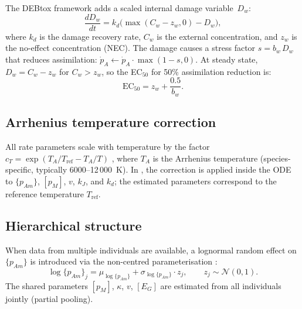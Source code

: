 \documentclass[article,shortnames]{jss}
\newcommand{\pAm}{\{p_{Am}\}}
\newcommand{\pM}{[p_M]}
\newcommand{\EG}{[E_G]}
\begin{document}
The DEBtox framework \citep{JagerDEBtox2006, JagerZimmer2012} adds a
scaled internal damage variable~$D_w$:
\begin{equation}
  \frac{dD_w}{dt} = k_d \bigl(\max(C_w - z_w, 0) - D_w\bigr),
    \label{eq:Dw}
\end{equation}
where $k_d$ is the damage recovery rate, $C_w$ is the external
concentration, and $z_w$ is the no-effect concentration (NEC).  The
damage causes a stress factor $s = b_w \, D_w$ that reduces
assimilation: $\dot{p}_A \leftarrow \dot{p}_A \cdot \max(1 - s, 0)$.
At steady state, $D_w = C_w - z_w$ for $C_w > z_w$, so the
EC$_{50}$ for 50\% assimilation reduction is:
\begin{equation}
  \mathrm{EC}_{50} = z_w + \frac{0.5}{b_w}.
    \label{eq:EC50}
\end{equation}

\subsection{Arrhenius temperature correction} \label{sec:arrhenius}

All rate parameters scale with temperature by the factor
$c_T = \exp(T_A / T_{\mathrm{ref}} - T_A / T)$
\citep[Eq.~1.2]{Kooijman2010}, where $T_A$ is the Arrhenius
temperature (species-specific, typically 6000--12\,000~K).  In
, the correction is applied inside the
 ODE to $\pAm$, $\pM$, $v$, $k_J$, and $k_d$;
the estimated parameters correspond to the reference temperature
$T_{\mathrm{ref}}$.

\subsection{Hierarchical structure} \label{sec:hierarchical}

When data from multiple individuals are available, a lognormal random
effect on $\pAm$ is introduced via the non-centred parameterisation
\citep{BetancourtHierarchical2015}:
\begin{equation}
  \log \pAm_j = \mu_{\log \pAm} + \sigma_{\log \pAm} \cdot z_j,
  \qquad z_j \sim \mathcal{N}(0, 1).
    \label{eq:hier}
\end{equation}
The shared parameters $\pM$, $\kappa$, $v$, $\EG$ are estimated from
all individuals jointly (partial pooling).
\end{document}
